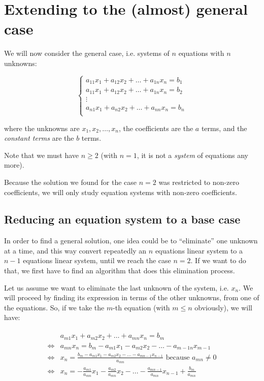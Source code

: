 \documentclass[11pt]{article}
\begin{document}
\section{Extending to the (almost) general case}

We will now consider the general case, i.e. systems of $n$ equations with $n$ unknowns:

\[
\begin{cases}
    a_{11} x_1 + a_{12} x_2 + \dots + a_{1n} x_n = b_1 \\
    a_{11} x_1 + a_{12} x_2 + \dots + a_{1n} x_n = b_2 \\
    \vdots \\
    a_{n1} x_1 + a_{n2} x_2 + \dots + a_{nn} x_n = b_n \\
\end{cases}
\]

where the unknowns are $x_1, x_2, \dots, x_n$, the coefficients are the $a$ terms, and the \textit{constant terms} are the $b$ terms.

Note that we must have $n \ge 2$ (with $n = 1$, it is not a \textit{system} of equations any more).
 
Because the solution we found for the case $n = 2$ was restricted to non-zero coefficients, we will only study equation systems with non-zero coefficients.

\subsection{Reducing an equation system to a base case}

In order to find a general solution, one idea could be to ``eliminate'' one unknown at a time, and this way convert repeatedly an $n$ equations linear system to a $n - 1$ equations linear system, until we reach the case $n = 2$.
If we want to do that, we first have to find an algorithm that does this elimination process.

Let us assume we want to eliminate the last unknown of the system, i.e. $x_n$.
We will proceed by finding its expression in terms of the other unknowns, from one of the equations.
So, if we take the $m$-th equation (with $m \le n$ obviously), we will have:

\begin{align*}
\begin{aligned}
    &a_{m1} x_1 + a_{m2} x_2 + \dots + a_{mn} x_n = b_m \\
    \iff &a_{mn} x_n = b_m - a_{m1} x_1 - a_{m2} x_2 - \dots - a_{m-1n} x_{m - 1} \\
    \iff &x_n = \frac{b_m - a_{m1} x_1 - a_{m2} x_2 - \dots - a_{mn - 1} x_{n - 1}}{a_{mn}} \text{ because $a_{mn} \neq 0$} \\
    \iff &x_n = -\frac{a_{m1}}{a_{mn}} x_1 - \frac{a_{m2}}{a_{mn}} x_2 - ... - \frac{a_{mn - 1}}{a_{mn}} x_{n - 1} + \frac{b_m}{a_{mn}}
\end{aligned}
\end{align*}
\end{document}
